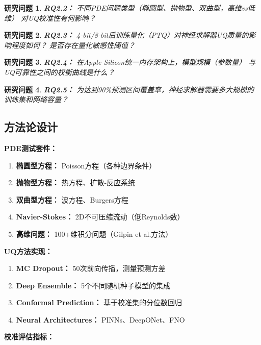 \documentclass[12pt,a4paper,twoside]{article}
\newtheorem{researchq}{研究问题}[section]
\begin{document}
\begin{inversation}
\begin{researchq}
\textbf{RQ2.2：} 不同PDE问题类型（椭圆型、抛物型、双曲型，高维vs低维）
对UQ校准性有何影响？
\end{researchq}

\begin{researchq}
\textbf{RQ2.3：} 4-bit/8-bit后训练量化（PTQ）对神经求解器UQ质量的影响程度如何？
是否存在量化敏感性阈值？
\end{researchq}

\begin{researchq}
\textbf{RQ2.4：} 在Apple Silicon统一内存架构上，模型规模（参数量）
与UQ可靠性之间的权衡曲线是什么？
\end{researchq}

\begin{researchq}
\textbf{RQ2.5：} 为达到90\%预测区间覆盖率，神经求解器需要多大规模的
训练集和网络容量？
\end{researchq}

\subsection{方法论设计}

\textbf{PDE测试套件：}

\begin{enumerate}
    \item \textbf{椭圆型方程：} Poisson方程（各种边界条件）
    \item \textbf{抛物型方程：} 热方程、扩散-反应系统
    \item \textbf{双曲型方程：} 波方程、Burgers方程
    \item \textbf{Navier-Stokes：} 2D不可压缩流动（低Reynolds数）
    \item \textbf{高维问题：} 100+维积分问题（Gilpin et al.方法）
\end{enumerate}

\textbf{UQ方法实现：}

\begin{enumerate}
    \item \textbf{MC Dropout：} 50次前向传播，测量预测方差
    \item \textbf{Deep Ensemble：} 5个不同随机种子模型的集成
    \item \textbf{Conformal Prediction：} 基于校准集的分位数回归
    \item \textbf{Neural Architectures：} PINNs、DeepONet、FNO
\end{enumerate}

\textbf{校准评估指标：}


\end{inversation}
\end{document}
